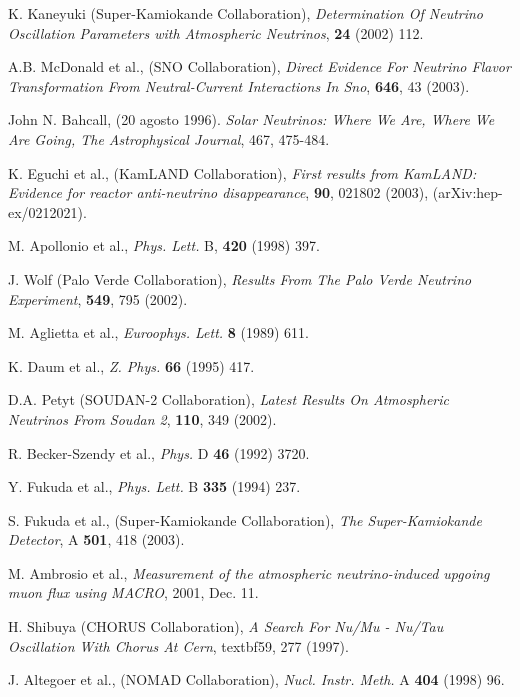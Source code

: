 \begin{thebibliography}{99}
 K. Kaneyuki (Super-Kamiokande Collaboration), \emph{Determination Of Neutrino Oscillation Parameters with Atmospheric Neutrinos}, \textbf{24} (2002) 112.

 A.B. McDonald et al., (SNO Collaboration), \emph{Direct Evidence For Neutrino Flavor Transformation From Neutral-Current Interactions In Sno}, \textbf{646}, 43 (2003).

 John N. Bahcall, (20 agosto 1996). \emph{Solar Neutrinos: Where We Are, Where We Are Going, The Astrophysical Journal}, 467, 475-484.

 K. Eguchi et al., (KamLAND Collaboration), \emph{First results from KamLAND: Evidence for reactor anti-neutrino  disappearance}, \textbf{90}, 021802 (2003), (arXiv:hep-ex/0212021).


 M. Apollonio et al., \emph{Phys. Lett.} B, \textbf{420} (1998) 397.

 J. Wolf (Palo Verde Collaboration), \emph{Results From The Palo Verde Neutrino Experiment}, \textbf{549}, 795 (2002).

 M. Aglietta et al., \emph{Euroophys. Lett.} \textbf{8} (1989) 611.

 K. Daum et al., \emph{Z. Phys.} \textbf{66} (1995) 417.

 D.A. Petyt (SOUDAN-2 Collaboration), \emph{Latest Results On Atmospheric Neutrinos From Soudan 2}, \textbf{110}, 349 (2002).

 R. Becker-Szendy et al., \emph{Phys.} D \textbf{46} (1992) 3720.

 Y. Fukuda et al., \emph{Phys. Lett.} B \textbf{335} (1994) 237.

 S. Fukuda et al., (Super-Kamiokande Collaboration), \emph{The Super-Kamiokande Detector}, A \textbf{501}, 418 (2003).

 M. Ambrosio et al., \emph{Measurement of the atmospheric neutrino-induced upgoing muon flux using MACRO}, 2001, Dec. 11.

 H. Shibuya (CHORUS Collaboration), \emph{A Search For Nu/Mu - Nu/Tau Oscillation With Chorus At Cern}, textbf{59}, 277 (1997).

 J. Altegoer et al., (NOMAD Collaboration), \emph{Nucl. Instr. Meth.} A \textbf{404} (1998) 96.


\end{thebibliography}

